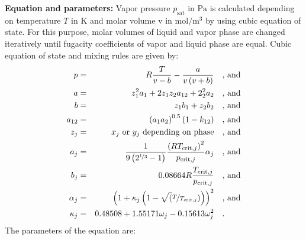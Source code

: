 \textbf{Equation and parameters:}
\newline
%
Vapor pressure $p_\mathrm{sat}$ in $\si{\pascal}$ is calculated depending on temperature $T$ in $\si{\kelvin}$ and molar volume v in $\si{\mole\per\cubic\meter}$ by using cubic equation of state. For this purpose, molar volumes of liquid and vapor phase are changed iteratively until fugacity coefficients of vapor and liquid phase are equal. Cubic equation of state and mixing rules are given by:
\begin{equation*}
\begin{split}
p &=& R \frac{T}{v - b} - \frac{a}{v \left(v + b\right)} & \quad\text{, and} \\
a &=& z_1^2 a_1 + 2 z_1 z_2 a_{12} + 2_2^2 a_2 & \quad\text{, and} \\
b &=& z_1 b_1 + z_2 b_2 & \quad\text{, and} \\
a_{12} &=& \left( a_1 a_2 \right) ^{0.5} \left(1 - k_{12} \right) & \quad\text{, and} \\
z_j &=& x_j \textrm { or } y_j \textrm{ depending on phase} & \quad\text{, and} \\
a_j &=& \frac{1}{9 \left(2^{\nicefrac{1}{3}} - 1\right)} \frac{\left(R T_{\mathrm{crit},j} \right)^2}{p_{\mathrm{crit},j}} \alpha_j & \quad\text{, and} \\
b_j &=& 0.08664 R \frac{T_{\mathrm{crit},j}}{p_{\mathrm{crit},j}} & \quad\text{, and} \\
\alpha_j &=& \left(1 + \kappa_j \left(1 - \sqrt(\nicefrac{T}{T_{\mathrm{crit},j}}) \right) \right)^2 & \quad\text{, and} \\
\kappa_j &=& 0.48508 + 1.55171 \omega_j - 0.15613 \omega_j^2 & \quad\text{.}
\end{split}
\end{equation*}
%
The parameters of the equation are:
%
